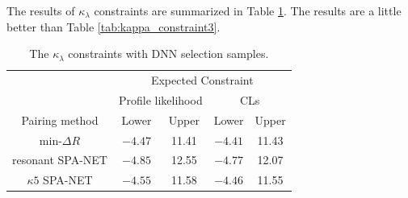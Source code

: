 \documentclass[12pt]{article}
\begin{document}
		The results of $\kappa_\lambda$ constraints are summarized in Table \ref{tab:kappa_constraint4}. The results are a little better than Table \ref{tab:kappa_constraint3}.
		\begin{table}[htpb]
			\centering
			\caption{The $\kappa_\lambda$ constraints with DNN selection samples.}
			\label{tab:kappa_constraint4}
			\begin{tabular}{c|cc|cc}
								  & \multicolumn{4}{c}{Expected Constraint}                          \\
								  & \multicolumn{2}{c}{Profile likelihood} & \multicolumn{2}{c}{CLs} \\ \hline
			Pairing method        & Lower              & Upper             & Lower      & Upper      \\ \hline
			$\text{min-}\Delta R$ & $-4.47$            & 11.41             & $-4.41$      & 11.43      \\
			resonant SPA-NET      & $-4.85$            & 12.55             & $-4.77$      & 12.07      \\
			$\kappa 5$ SPA-NET    & $-4.55$            & 11.58             & $-4.46$      & 11.55   
			\end{tabular}
		\end{table}
\end{document}
